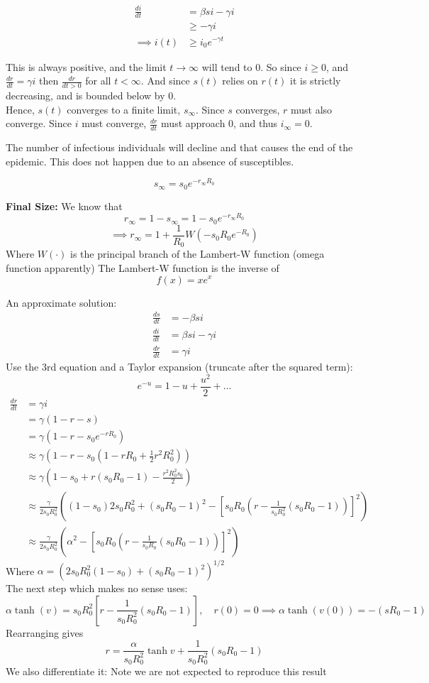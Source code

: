 \documentclass{/home/janmebows/Documents/LatexTemplates/myassignment}
\begin{document}
\begin{align*}
    \frac{di}{dt} &= \beta si - \gamma i\\
    &\geq  -\gamma i\\
    \implies i(t) &\geq i_0 e^{-\gamma t}
\end{align*}

This is always positive, and the limit $t\to \infty$ will tend to $0$.
So since $i \geq 0$, and $\frac{dr}{dt} = \gamma i$ then $\frac{dr}{dt > 0}$ for all $t<\infty$.
And since $s(t)$ relies on $r(t)$ it is strictly decreasing, and is bounded below by $0$.\\
Hence, $s(t)$ converges to a finite limit, $s_\infty$. Since $s$ converges, $r$ must also converge. 
Since $i$ must converge, $\frac{dr}{dt}$ must approach $0$, and thus $i_\infty = 0$.

The number of infectious individuals will decline and that causes the end of the epidemic. This does not happen due to an absence of susceptibles.

\[s_\infty = s_0 e^{-r_\infty R_0}\]

\textbf{Final Size:}
We know that 
\[r_\infty = 1-s_\infty = 1-s_0 e^{-r_\infty R_0}\]
\[\implies r_\infty = 1 + \frac1{R_0} W (-s_0 R_0 e^{-R_0})\]
Where $W(\cdot)$ is the principal branch of the Lambert-W function (omega function apparently)
The Lambert-W function is the inverse of
\[f(x) = xe^{x}\]

An approximate solution:
\begin{align*}
    \frac{ds}{dt}&= -\beta si\\
    \frac{di}{dt}&= \beta si - \gamma i\\
    \frac{dr}{dt}&= \gamma i
\end{align*}
Use the 3rd equation and a Taylor expansion (truncate after the squared term):
\[e^{-u} = 1 - u + \frac{u^2}{2} + \hdots\]
\begin{align*}
    \frac{dr}{dt}&=\gamma i\\
    &= \gamma(1-r-s)\\
    &= \gamma(1-r-s_0e^{-rR_0})\\
    &\approx \gamma\left(1-r-s_0\left(1-rR_0 + \frac12 r^2 R_0^2\right)\right)\\
    &\approx \gamma(1-s_0 + r(s_0R_0 - 1) - \frac{r^2R_0^2s_0}{2})\\
    &\approx \frac{\gamma}{2s_0R_0^2} \left((1-s_0)2s_0R_0^2 + (s_0R_0-1)^2 - \left[s_0R_0(r-\frac{1}{s_0R_0^2}(s_0R_0-1))\right]^2\right)\\
    &\approx \frac{\gamma}{2s_0R_0^2}\left(\alpha^2 - \left[s_0R_0(r- \frac{1}{s_0R_0}(s_0R_0-1))\right]^2\right)
\end{align*}
Where $\alpha = \left(2s_0R_0^2 (1-s_0) + (s_0R_0-1)^2\right)^{1/2}$\\
The next step which makes no sense uses:
\[\alpha \tanh(v) = s_0 R_0^2 [r- \frac{1}{s_0R_0^2}(s_0R_0-1)], \quad r(0)=0 \implies \alpha \tanh(v(0)) = -(sR_0-1) \]
Rearranging gives
\[r = \frac{\alpha}{s_0R_0^2} \tanh v + \frac{1}{s_0R_0^2}(s_0R_0-1) \]
We also differentiate it:
Note we are not expected to reproduce this result
\end{document}
